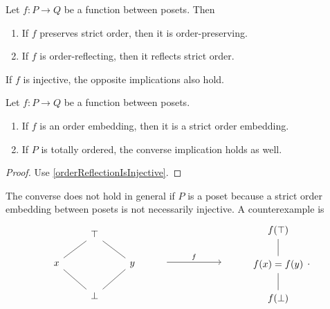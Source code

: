 \begin{lemma}
Let $f:P\to Q$ be a function between posets. Then
\begin{enumerate}
\item If $f$ preserves strict order, then it is order-preserving.
\item If $f$ is order-reflecting, then it reflects strict order.
\end{enumerate}
If $f$ is injective, the opposite implications also hold.
\end{lemma}
\begin{corollary}
Let $f: P\to Q$ be a function between posets.
\begin{enumerate}
\item If $f$ is an order embedding, then it is a strict order embedding.
\item If $P$ is totally ordered, the converse implication holds as well.
\end{enumerate}
\end{corollary}
\begin{proof}
Use \ref{orderReflectionIsInjective}.
\end{proof}

The converse does not hold in general if $P$ is a poset because a strict order embedding between posets is not necessarily injective. A counterexample is
\[
\begin{tikzcd}
& \top & \\
x \ar[ur, dash] & & y \ar[ul, dash] \\
& \bot \ar[ul, dash] \ar[ur, dash] &
\end{tikzcd} \qquad \begin{tikzcd} {} \arrow[rr, "f"] & {}& {}\end{tikzcd} \qquad \begin{tikzcd}
f(\top) \\ f(x) = f(y) \ar[u,dash] \\ f(\bot) \ar[u,dash]
\end{tikzcd}.
\]

